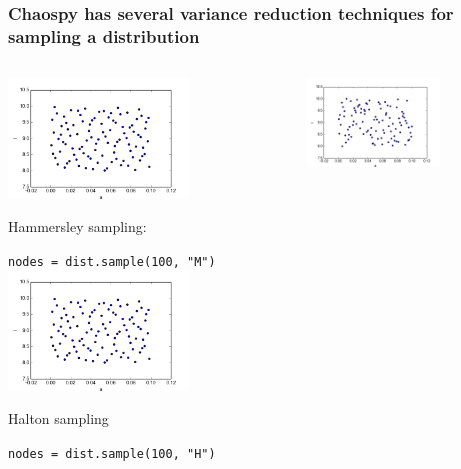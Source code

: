 \documentclass[handout]{beamer}
\begin{document}
\begin{frame}[fragile]
 \frametitle{Chaospy has several variance reduction techniques for sampling a distribution}
 \vspace{-5mm}
 \begin{columns}
     \begin{center}
                \includegraphics[width=0.65\textwidth]{samples_H.png}

                Hammersley sampling:

                \scriptsize
                \verb;nodes = dist.sample(100, "M");
                \normalsize
                \includegraphics[width=0.65\textwidth]{samples_H.png}

                Halton sampling

                \scriptsize
                \verb;nodes = dist.sample(100, "H");
                \normalsize

     \end{center}
     \begin{center}
                  \includegraphics[width=0.65\textwidth]{samples_L.png}


\end{center}
\end{columns}
\end{frame}
\end{document}
